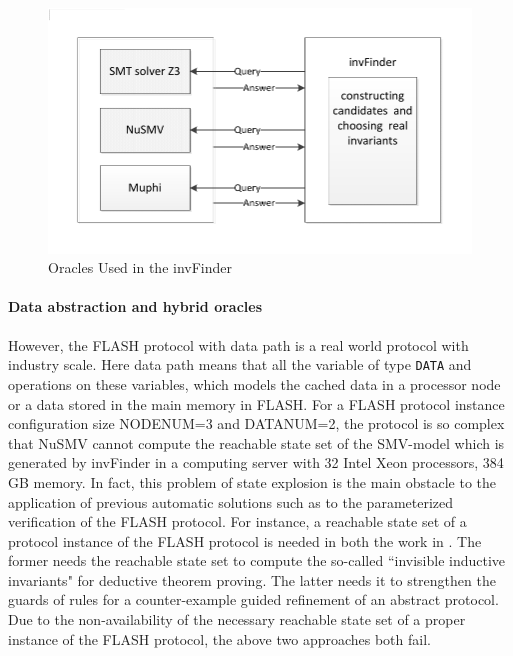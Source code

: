 \documentclass{llncs-new}
\begin{document}
 \begin{figure}[htbp]
\centering
\includegraphics[width=1.0\textwidth]{invFinderOracles.pdf}
\vspace{-20pt}
\caption{Oracles Used in the {\sf invFinder}\label{fig:invFinderOracles}
}
\end{figure}

\vspace{-10pt}
\paragraph{Data abstraction and hybrid oracles}
However, the FLASH protocol with data path is a real world protocol with industry scale. Here data path means that all the variable of type {\tt DATA} and operations on these variables, which models the cached data in a processor node or a data stored in the main memory in FLASH. For a FLASH protocol   instance configuration size NODENUM=3 and DATANUM=2, the protocol is so complex that NuSMV cannot compute the reachable state set of the SMV-model which is generated by {\sf invFinder} in a computing server  with 32 Intel Xeon processors, 384 GB memory. In fact, this problem of  state explosion is the main obstacle to the application of previous automatic solutions such as \cite{Arons2001,Lv2007} to the parameterized verification of the FLASH protocol. For instance, a reachable state set of a protocol instance of the FLASH protocol is needed in both the work in \cite{Arons2001,Lv2007}. The former needs the reachable state set to compute the so-called ``invisible inductive invariants" for deductive theorem proving. The latter needs it to strengthen
 the guards of rules for a counter-example guided refinement of an abstract protocol. Due to the non-availability of the necessary   reachable state set of a proper instance of the FLASH protocol, the above two approaches both fail.
\end{document}

